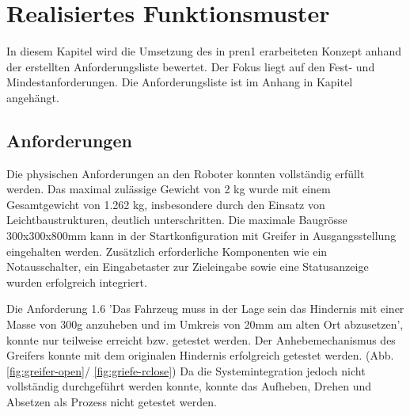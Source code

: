 \section{Realisiertes Funktionsmuster}

In diesem Kapitel wird die Umsetzung des in \acrshort{pren1} erarbeiteten Konzept anhand der  erstellten Anforderungsliste bewertet. Der Fokus liegt auf den Fest- und Mindestanforderungen. Die Anforderungsliste ist im Anhang in Kapitel  angehängt.

\subsection{Anforderungen}

Die physischen Anforderungen an den Roboter konnten vollständig erfüllt werden. Das maximal zulässige Gewicht von 2 kg wurde mit einem Gesamtgewicht von 1.262 kg, insbesondere durch den Einsatz von Leichtbaustrukturen, deutlich unterschritten. Die maximale Baugrösse 300x300x800mm kann in der Startkonfiguration mit Greifer in Ausgangsstellung eingehalten werden. Zusätzlich erforderliche Komponenten wie ein Notausschalter, ein Eingabetaster zur Zieleingabe sowie eine Statusanzeige wurden erfolgreich integriert.

Die Anforderung 1.6 'Das Fahrzeug muss in der Lage sein das Hindernis mit  einer Masse von 300g anzuheben und im Umkreis von 20mm am alten Ort abzusetzen', konnte nur teilweise erreicht bzw. getestet werden. Der Anhebemechanismus des Greifers konnte mit dem originalen Hindernis erfolgreich getestet werden. (Abb. \ref{fig:greifer-open}/ \ref{fig:griefe-rclose}) Da die Systemintegration jedoch nicht vollständig durchgeführt werden konnte, konnte das Aufheben, Drehen und Absetzen als Prozess nicht getestet werden.


